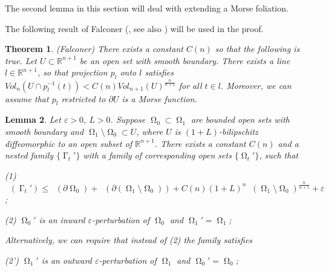 \documentclass[12pt]{amsart}
\newtheorem{theorem}{Theorem}[section]
\newtheorem{lemma}[theorem]{Lemma}
\DeclareMathOperator{\Hn}{\mathcal{H}^n}
\DeclareMathOperator{\Hnn}{\mathcal{H}^{n+1}}
\DeclareMathOperator{\G}{\Gamma}
\DeclareMathOperator{\Om}{\Omega}
\theoremstyle{definition}
\begin{document}
The second lemma in this section will deal with extending a Morse foliation.

The following result of Falconer
(\cite{Fa}, see also \cite[Appendix 6]{Gu1})
will be used in the proof.

\begin{theorem} \label{falconer}
(Falconer) There exists a constant $C(n)$ so that the following is true.
Let $U \subset \mathbb{R}^{n+1}$ be an open 
set with smooth boundary.
There exists a line $l \in \mathbb{R}^{n+1}$, so that
projection $p_l$ onto $l$ satisfies 
$Vol_{n}(U \cap p_l^{-1}(t)) < C(n) Vol_{n+1}(U)^{\frac{n}{n+1}}$
for all $t \in l$.
Moreover, we can assume that $p_l$ restricted to $\partial U$
is a Morse function.
\end{theorem}

\begin{lemma} \label{lem:extension}
Let $\varepsilon>0$, $L>0$.
Suppose $\Om_0 \subset \Om_1$ are bounded 
open sets with smooth boundary
and $\Om_1 \setminus \Om_0 \subset U$,
where $U$ is $(1+L)$-bilipschitz 
diffeomorphic to an open subset of $\mathbb{R}^{n+1}$.
There exists a constant $C(n)$ and a nested family $\{\G_t' \}$
with a family of corresponding open sets 
$\{\Om_t' \}$, such that 

(1) $\Hn(\G_t') \leq \Hn(\partial \Om_0)
+\Hn(\partial (\Om_1 \setminus \Om_0))+ C(n)(1+L)^n \Hnn(\Om_1 \setminus \Om_0)^{\frac{n}{n+1}}
+ \varepsilon$;


(2) $\Om_0'$ is an inward $\varepsilon$-perturbation
of $\Om_0$ and $\Om_1'=\Om_1$;

Alternatively, we can require that instead of (2)
the family satisfies 

(2') $\Om_1'$ is an outward $\varepsilon$-perturbation
of $\Om_1$ and $\Om_0'=\Om_0$;
\end{lemma}
\end{document}
